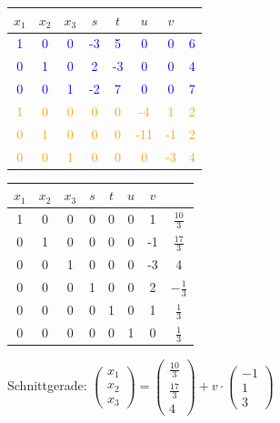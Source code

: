   		\begin{tabular}{| c c c c c c c | c |}
		\hline
		$x_1$ & $x_2$ & $x_3$ & $s$ & $t$ & $u$ & $v$ &  \\
		\hline
		\textcolor{blue}1 & \textcolor{blue}0 & \textcolor{blue}0 & \textcolor{blue}{-3} & \textcolor{blue}5 & \textcolor{blue}0 & \textcolor{blue}0 & \textcolor{blue}6\\
		\textcolor{blue}0 & \textcolor{blue}1 & \textcolor{blue}0 & \textcolor{blue}2 & \textcolor{blue}{-3} & \textcolor{blue}{0} & \textcolor{blue}0 & \textcolor{blue}4\\
		\textcolor{blue}0 & \textcolor{blue}0 & \textcolor{blue}1 & \textcolor{blue}{-2} & \textcolor{blue}7 & \textcolor{blue}0 & \textcolor{blue}0 & \textcolor{blue}7 \\
		\textcolor{orange}1 & \textcolor{orange}0 & \textcolor{orange}0 & \textcolor{orange}0 & \textcolor{orange}0 & \textcolor{orange}{-4} & \textcolor{orange}1 & \textcolor{orange}2 \\
		\textcolor{orange}0 & \textcolor{orange}1 & \textcolor{orange}0 & \textcolor{orange}0 & \textcolor{orange}0 & \textcolor{orange}{-11} & \textcolor{orange}{-1} & \textcolor{orange}2 \\
		\textcolor{orange}0 & \textcolor{orange}0 & \textcolor{orange}1 & \textcolor{orange}0 & \textcolor{orange}0 & \textcolor{orange}0 & \textcolor{orange}{-3} & \textcolor{orange}4 \\
		\hline
		\end{tabular}		
 
  		\begin{tabular}{| c c c c c c c | c |}
		\hline
		$x_1$ & $x_2$ & $x_3$ & $s$ & $t$ & $u$ & $v$ & \\
		\hline
		1 & 0 & 0 & 0 & 0 & 0 & 1 & $\frac{10}{3}$\\
		0 & 1 & 0 & 0 & 0 & 0 & -1 & $\frac{17}{3}$\\
		0 & 0 & 1 & 0 & 0 & 0 & -3 & 4\\
		0 & 0 & 0 & 1 & 0 & 0 & 2 & $-\frac{1}{3}$\\
		0 & 0 & 0 & 0 & 1 & 0 & 1 & $\frac{1}{3}$\\
		0 & 0 & 0 & 0 & 0 & 1 & 0 & $\frac{1}{3}$\\
		\hline
		\end{tabular}		
		
		\vspace{0.1cm}

		Schnittgerade: $\begin{pmatrix} x_1 \\ x_2 \\ x_3 \end{pmatrix} = \begin{pmatrix} \frac{10}{3} \\ \frac{17}{3} \\ 4 \end{pmatrix} + v \cdot \begin{pmatrix} -1 \\ 1 \\ 3 \end{pmatrix} $
		
